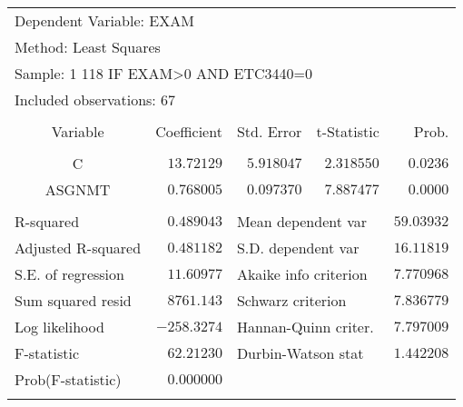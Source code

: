 \documentclass[12pt]{report}
\begin{document}
\begin{figure}[H]
	\centering
\end{figure}
\vspace{-\baselineskip}
\begin{table}[H]
	\centering
	\begin{tabular}{lrrrr}
		\multicolumn{3}{l}{Dependent Variable: EXAM}&\multicolumn{1}{c}{}&\multicolumn{1}{c}{}\\
		\multicolumn{3}{l}{Method: Least Squares}&\multicolumn{1}{c}{}&\multicolumn{1}{c}{}\\
		\multicolumn{4}{l}{Sample: 1 118 IF EXAM\textgreater 0 AND ETC3440=0}&\multicolumn{1}{c}{}\\
		\multicolumn{3}{l}{Included observations: 67}&\multicolumn{1}{c}{}&\multicolumn{1}{c}{}\\
		[4.5pt] \hline \\ [-4.5pt]
		\multicolumn{1}{c}{Variable}&\multicolumn{1}{r}{Coefficient}&\multicolumn{1}{r}{Std. Error}&\multicolumn{1}{r}{t-Statistic}&\multicolumn{1}{r}{Prob.}\\
		[4.5pt] \hline \\ [-4.5pt]
		\multicolumn{1}{c}{C}&\multicolumn{1}{r}{$13.72129$}&\multicolumn{1}{r}{$5.918047$}&\multicolumn{1}{r}{$2.318550$}&\multicolumn{1}{r}{$0.0236$}\\
		\multicolumn{1}{c}{ASGNMT}&\multicolumn{1}{r}{$0.768005$}&\multicolumn{1}{r}{$0.097370$}&\multicolumn{1}{r}{$7.887477$}&\multicolumn{1}{r}{$0.0000$}\\
		[4.5pt] \hline \\ [-4.5pt]
		\multicolumn{1}{l}{R-squared}&\multicolumn{1}{r}{$0.489043$}&\multicolumn{2}{l}{Mean dependent var}&\multicolumn{1}{r}{$59.03932$}\\
		\multicolumn{1}{l}{Adjusted R-squared}&\multicolumn{1}{r}{$0.481182$}&\multicolumn{2}{l}{S.D. dependent var}&\multicolumn{1}{r}{$16.11819$}\\
		\multicolumn{1}{l}{S.E. of regression}&\multicolumn{1}{r}{$11.60977$}&\multicolumn{2}{l}{Akaike info criterion}&\multicolumn{1}{r}{$7.770968$}\\
		\multicolumn{1}{l}{Sum squared resid}&\multicolumn{1}{r}{$8761.143$}&\multicolumn{2}{l}{Schwarz criterion}&\multicolumn{1}{r}{$7.836779$}\\
		\multicolumn{1}{l}{Log likelihood}&\multicolumn{1}{r}{$-258.3274$}&\multicolumn{2}{l}{Hannan-Quinn criter.}&\multicolumn{1}{r}{$7.797009$}\\
		\multicolumn{1}{l}{F-statistic}&\multicolumn{1}{r}{$62.21230$}&\multicolumn{2}{l}{Durbin-Watson stat}&\multicolumn{1}{r}{$1.442208$}\\
		\multicolumn{1}{l}{Prob(F-statistic)}&\multicolumn{1}{r}{$0.000000$}&\multicolumn{1}{c}{}&\multicolumn{1}{c}{}&\multicolumn{1}{c}{}\\
		[4.5pt] \hline \\ [-4.5pt]
	\end{tabular}
\end{table}
\end{document}
